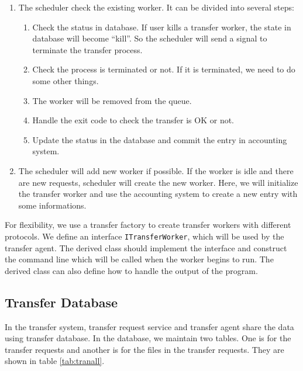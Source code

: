 \begin{enumerate}
\item The scheduler check the existing worker.
It can be divided into several steps:
\begin{enumerate}
    \item Check the status in database.
          If user kills a transfer worker, the state in
          database will become ``kill''.
          So the scheduler will
          send a signal to terminate the
          transfer process.
    \item Check the process is terminated or not.
          If it is terminated, we need to do some other things.
    \item The worker will be removed from the queue.
    \item Handle the exit code to check the transfer is OK or not.
    \item Update the status in the database 
          and commit the entry in accounting system.
\end{enumerate}
\item The scheduler will add new worker if possible.
If the worker is idle and there are new requests,
scheduler will create the new worker.
Here, we will initialize the transfer worker and use the accounting
system to create a new entry with some informations.
\end{enumerate}
For flexibility, we use a transfer factory to create transfer workers
with different protocols. 
We define an interface {\tt ITransferWorker},
which will be used by the transfer agent. The derived class should
implement the interface and construct the command line which will 
be called when the worker begins to run.
The derived class can also define how to handle the output of the 
program.

\subsection{Transfer Database}

In the transfer system, transfer request service and transfer agent
share the data using transfer database. In the database, we maintain
two tables. One is for the transfer requests and another is for the 
files in the transfer requests. They are shown in table 
\ref{tab:tranall}.


